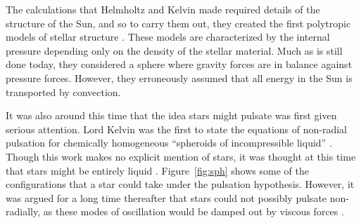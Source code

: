 The calculations that Helmholtz and Kelvin made required details of the structure of the Sun, and so to carry them out, they created the first polytropic models of stellar structure \citep[e.g.,][]{ARNY1990211}. 
These models are characterized by the internal pressure depending only on the density of the stellar material. 
Much as is still done today, they considered a sphere where gravity forces are in balance against pressure forces. 
However, they erroneously assumed that all energy in the Sun is transported by convection. 

It was also around this time that the idea stars might pulsate was first given serious attention. %
Lord Kelvin was the first to state the equations of non-radial pulsation for chemically homogeneous ``spheroids of incompressible liquid'' \citep{1863RSPT..153..583T}. 
Though this work makes no explicit mention of stars, it was thought at this time that stars might be entirely liquid \citep[e.g.,][]{ARNY1990211}. 
Figure~\ref{fig:sph} shows some of the configurations that a star could take under the pulsation hypothesis. 
However, it was argued for a long time thereafter that stars could not possibly pulsate non-radially, as these modes of oscillation would be damped out by viscous forces \citep[e.g.,][]{1938ApJ....88..189P}. 

